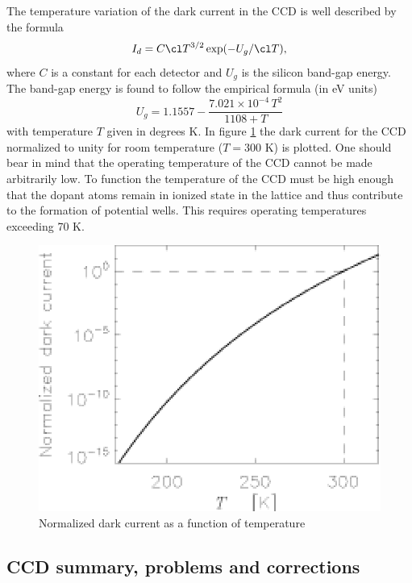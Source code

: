 The temperature variation of the dark current in the CCD is well
described by the formula
\begin{equation}
  I_d = C \cl T^{3/2} \exp(-U_g/\cl T),
\end{equation}
where $C$ is a constant for each detector and $U_g$ is the silicon
band-gap energy. The band-gap energy is found to follow the empirical
formula (in eV units)
\begin{equation}
  U_g = 1.1557 - \frac{7.021\times 10^{-4}\, T^2}{1108+T}
\end{equation} 
with temperature $T$ given in degrees K. In figure \ref{CCD.figdark}
the dark current for the CCD normalized to unity for room temperature
($T = 300$ K) is plotted.  One should bear in mind that the operating
temperature of the CCD cannot be made arbitrarily low. To function the
temperature of the CCD must be high enough that the dopant atoms
remain in ionized state in the lattice and thus contribute to the
formation of potential wells. This requires operating temperatures
exceeding 70 K.

\begin{figure}[h]
  \centering
	\includegraphics{CCD_dark.eps}
  \caption{Normalized dark current as a function of temperature }
  \label{CCD.figdark}
\end{figure}

\subsection{CCD summary, problems and corrections}

